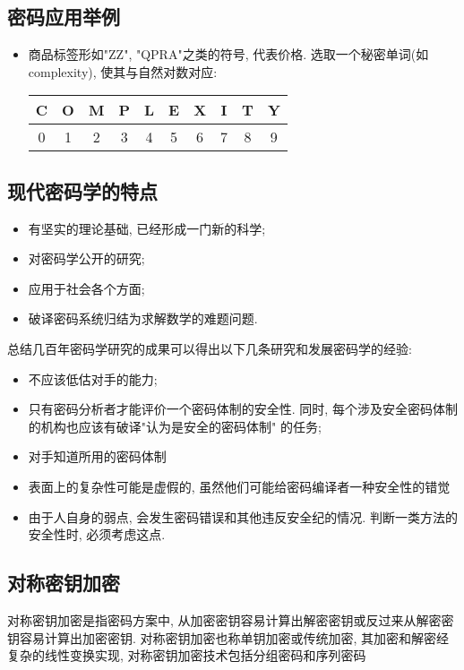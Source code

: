 \documentclass[UTF8]{ctexart}
\begin{document}
    \subsection{密码应用举例}
    \begin{itemize}
        \item 商品标签形如"ZZ", "QPRA"之类的符号, 代表价格. 选取一个秘密单词(如complexity), 使其与自然对数对应:

            \centering
            \begin{tabular}{|c|c|c|c|c|c|c|c|c|c|} %
                \hline
                C&O&M&P&L&E&X&I&T&Y\\
                \hline
                0&1&2&3&4&5&6&7&8&9\\
                \hline
            \end{tabular}

    \end{itemize}

    \subsection{现代密码学的特点}
    \begin{itemize}
        \item 有坚实的理论基础, 已经形成一门新的科学;
        \item 对密码学公开的研究;
        \item 应用于社会各个方面;
        \item 破译密码系统归结为求解数学的难题问题.
    \end{itemize}

    总结几百年密码学研究的成果可以得出以下几条研究和发展密码学的经验:
    \begin{itemize}
        \item 不应该低估对手的能力;
        \item 只有密码分析者才能评价一个密码体制的安全性. 同时, 每个涉及安全密码体制的机构也应该有破译"认为是安全的密码体制" 的任务;
        \item 对手知道所用的密码体制
        \item 表面上的复杂性可能是虚假的, 虽然他们可能给密码编译者一种安全性的错觉
        \item 由于人自身的弱点, 会发生密码错误和其他违反安全纪的情况. 判断一类方法的安全性时, 必须考虑这点.
    \end{itemize}

    \subsection{对称密钥加密}
    对称密钥加密是指密码方案中, 从加密密钥容易计算出解密密钥或反过来从解密密钥容易计算出加密密钥. 对称密钥加密也称单钥加密或传统加密, 其加密和解密经复杂的线性变换实现, 对称密钥加密技术包括分组密码和序列密码
\end{document}
